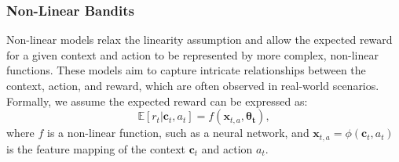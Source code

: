 \subsubsection{Non-Linear Bandits}
Non-linear models relax the linearity assumption and allow the expected reward for a given context and action to be represented by more complex, non-linear functions. These models aim to capture intricate relationships between the context, action, and reward, which are often observed in real-world scenarios. Formally, we assume the expected reward can be expressed as:
\begin{equation}
    \mathbb{E}[r_t  \vert  \mathbf{c}_t, a_t] = f(\mathbf{x}_{t,a}, \boldsymbol{\theta_t}),
\end{equation}
where $f$ is a non-linear function, such as a neural network, and $\mathbf{x}_{t,a}  = \phi(\mathbf{c}_t, a_t)$ is the feature mapping of the context $\mathbf{c}_t$ and action $a_t$.


